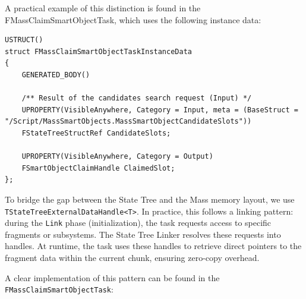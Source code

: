 A practical example of this distinction is found in the FMassClaimSmartObjectTask, which uses the following instance data:

\begin{lstlisting}
USTRUCT()
struct FMassClaimSmartObjectTaskInstanceData
{
	GENERATED_BODY()

	/** Result of the candidates search request (Input) */
	UPROPERTY(VisibleAnywhere, Category = Input, meta = (BaseStruct = "/Script/MassSmartObjects.MassSmartObjectCandidateSlots"))
	FStateTreeStructRef CandidateSlots;

	UPROPERTY(VisibleAnywhere, Category = Output)
	FSmartObjectClaimHandle ClaimedSlot;
};
\end{lstlisting}


To bridge the gap between the State Tree and the Mass memory layout, we use \texttt{TStateTreeExternalDataHandle<T>}.
In practice, this follows a linking pattern: during the \texttt{Link} phase (initialization), the task requests access to specific fragments or subsystems. The State Tree Linker resolves these requests into handles. At runtime, the task uses these handles to retrieve direct pointers to the fragment data within the current chunk, ensuring zero-copy overhead.

A clear implementation of this pattern can be found in the \newline\texttt{FMassClaimSmartObjectTask}:


